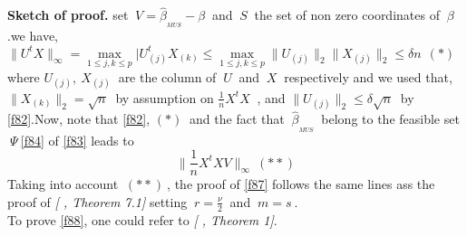 \documentclass[12pt]{report}
\begin{document}
\textbf{Sketch of proof.} set $\ V=\hat{\beta}_{_{MUS}}-\beta\ $ and $\ S\ $ the set of non zero coordinates of $\ \beta$.we have,\\
$\parallel U^{t}X\parallel_{\infty}=\underset{1\leq j,k \leq p}{\max}|U_{(j)}^{t}X_{(k)}\leq \underset{1\leq j,k \leq p}{\max}\parallel U_{(j)}\parallel_{2}\parallel X_{(j)}\parallel_{2}\leq \delta n\ \ (\ast)$\\
where $U_{(j)},\ X_{(j)}\ $ are the column of $\ U\ $ and $\ X\ $ respectively and we used that, $\parallel X_{(k)}\parallel_{2}=\sqrt{n}\ $ by assumption on $\frac{1}{n}X^{t}X\ $ , and $\parallel U_{(j)}\parallel_{2}\leq \delta \sqrt{n}\ $ by \eqref{f82}.Now, note that \eqref{f82}, $(\ast)\ $ and the fact that $\  \hat{\beta}_{_{MUS}}\ $ belong to the feasible set $\ \Psi\ $\eqref{f84} of \eqref{f83} leads to $$ \parallel\frac{1}{n}X^{t}XV \parallel_{\infty}\ (\ast \ast)$$
Taking into account $\ (\ast \ast)\ $, the proof of \eqref{f87} follows the same lines ass the proof of \textit{[ \cite{nref23}, Theorem 7.1]} setting $\ r=\frac{\nu}{2}\ $ and $\ m=s\ $.\\
To prove \eqref{f88}, one could refer to \textit{[ \cite{nref23}, Theorem 1]}.
\end{document}
